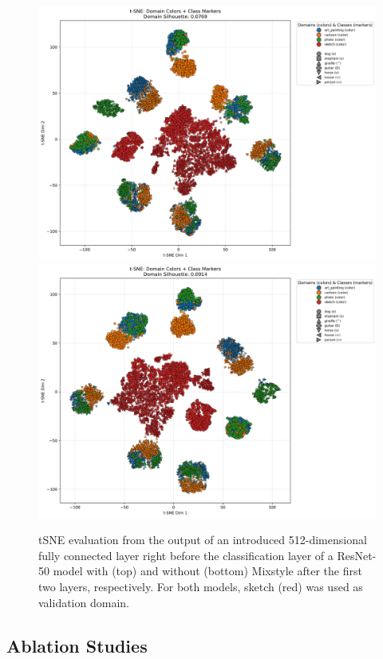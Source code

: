 \begin{figure}
    \centering
    \includegraphics[width=.95\textwidth]{images/tsne_pacs_resnet50_fc512_ms12_a0d1_.png}
    \includegraphics[width=.95\textwidth]{images/tsne_pacs_resnet50_fc512_.png}
    \caption{tSNE evaluation from the output of an introduced 512-dimensional fully connected layer right before the classification layer of a ResNet-50 model with (top) and without (bottom) Mixstyle after the first two layers, respectively. For both models, sketch (red) was used as validation domain.}
    \label{fig:tSNE}
\end{figure}

\subsection{Ablation Studies}

